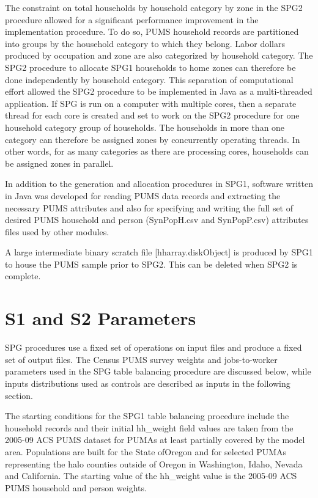 The constraint on total households by household category by zone in the SPG2 procedure allowed for a significant performance improvement in the implementation procedure. To do so, PUMS household records are partitioned into groups by the household category to which they belong. Labor dollars produced by occupation and zone are also categorized by household category. The SPG2 procedure to allocate SPG1 households to home zones can therefore be done independently by household category. This separation of computational effort allowed the SPG2 procedure to be implemented in Java as a multi-threaded application. If SPG is run on a computer with multiple cores, then a separate thread for each core is created and set to work on the SPG2 procedure for one household category group of households. The households in more than one category can therefore be assigned zones by concurrently operating threads. In other words, for as many categories as there are processing cores, households can be assigned zones in parallel.

In addition to the generation and allocation procedures in SPG1, software written in Java was developed for reading PUMS data records and extracting the necessary PUMS attributes and also for specifying and writing the full set of desired PUMS household and person (SynPopH.csv and SynPopP.csv) attributes files used by other modules.

A large intermediate binary scratch file [hharray.diskObject] is produced by SPG1 to house the PUMS sample prior to SPG2. This can be deleted when SPG2 is complete.

\section{S1 and S2 Parameters}\label{sec:spg-s1-s2}
SPG procedures use a fixed set of operations on input files and produce a fixed set of output files. The Census PUMS survey weights and jobs-to-worker parameters used in the SPG table balancing procedure are discussed below, while inputs distributions used as controls are described as inputs in the following section. 

The starting conditions for the SPG1 table balancing procedure include the household records and their initial hh\_weight field values are taken from the 2005-09 ACS PUMS dataset for PUMAs at least partially covered by the model area. Populations are built for the State ofOregon and for selected PUMAs representing the halo counties outside of Oregon in Washington, Idaho, Nevada and California. The starting value of the hh\_weight value is the 2005-09 ACS PUMS household and person weights. 


